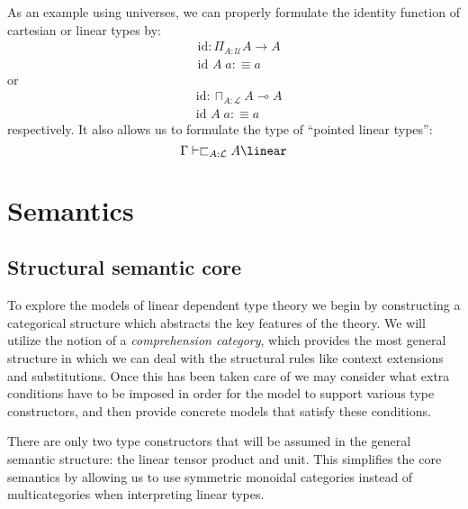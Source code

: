 As an example using universes, we can properly formulate the identity function of cartesian or linear types by:
\[
  \begin{split}
&    \text{id} : \Pi_{A : \mathcal{U}}A \to A\\
&    \text{id }A \; a :\equiv a
    \end{split}
\]
or
\[
\begin{split}
&  \text{id} : \sqcap_{A : \mathcal{L}}A \multimap A\\
&  \text{id }A \; a :\equiv a
\end{split}
\]
respectively.
It also allows us to formulate the type of ``pointed linear types'':
\[
\Gamma \vdash \sqsubset_{A : \mathcal{L}}A \linear
\]
\section{Semantics}\label{semantics}
\subsection{Structural semantic core}
To explore the models of linear dependent type theory we begin by constructing a categorical structure which abstracts the key features of the theory. We will utilize the notion of a \textit{comprehension category}, which provides the most general structure in which we can deal with the structural rules like context extensions and substitutions. Once this has been taken care of we may consider what extra conditions have to be imposed in order for the model to support various type constructors, and then provide concrete models that satisfy these conditions.


There are only two type constructors that will be assumed in the general semantic structure: the linear tensor product and unit. This simplifies the core semantics by allowing us to use symmetric monoidal categories instead of multicategories when interpreting linear types.


